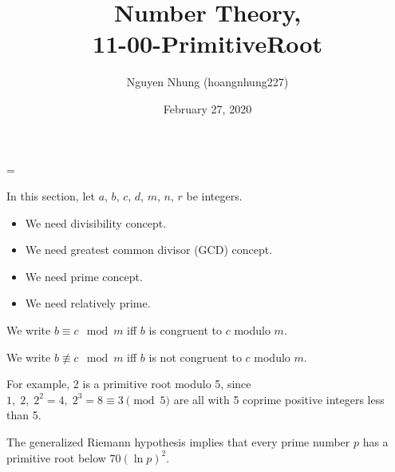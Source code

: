 \documentclass[12pt]{article}
\title{Number Theory,\\ 11-00-PrimitiveRoot}
\date{February 27, 2020}
\author{Nguyen Nhung (hoangnhung227)}
\newcommand{\notequiv}{\not\equiv}
\begin{document}
  \parskip=\baselineskip

  \begin{cnl}

  \bigskip

  In this section, let $a$, $b$, $c$, $d$, $m$, $n$, $r$ be integers.

  \begin{remark}
 	\begin{itemize}
 	\item We need divisibility concept.
 	\item We need greatest common divisor (GCD) concept.
 	\item We need prime concept.
 	\item We need relatively prime.
 	\end{itemize}
 \end{remark}


  We write $ b \equiv c \mod m$ iff $b$ is congruent to $c$ modulo $m$.

  We write $ b \notequiv c \mod m$ iff $b$ is not congruent to $c$ modulo $m$.


  \begin{remark}
 For example, 2 is a primitive root modulo 5, since
 $1,\; 2,\; 2^2 = 4,\; 2^3 = 8 \equiv 3 \pmod{5}$
 are all with 5 coprime positive integers less than 5.\\
 \end{remark}

  \begin{remark}
 The generalized Riemann hypothesis implies that every prime number $p$ has a primitive root below $70(\ln p)^2$.
 \end{remark}

 \end{cnl}
 
\end{document}
